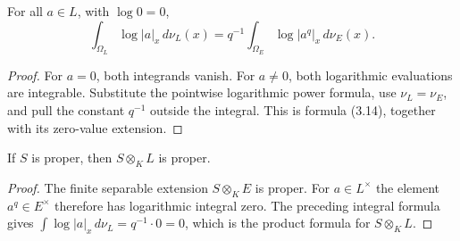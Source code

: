 \begin{proposition}
\label{prop:finite-log-integral}
\leanok
{}
For all $a\in L$, with $\log0=0$,
\[
 \int_{\Omega_L}\log|a|_x\,d\nu_L(x)
 =q^{-1}\int_{\Omega_E}\log|a^q|_x\,d\nu_E(x).
\]
\end{proposition}
\begin{proof}
For $a=0$, both integrands vanish. For $a\ne0$, both logarithmic
evaluations are integrable. Substitute the pointwise logarithmic power
formula, use $\nu_L=\nu_E$, and pull the constant $q^{-1}$ outside
the integral. This is formula (3.14), together with its zero-value
extension.
\end{proof}

\begin{proposition}
\label{prop:finite-proper}
\leanok
{}
If $S$ is proper, then $S\otimes_KL$ is proper.
\end{proposition}
\begin{proof}
The finite separable extension $S\otimes_KE$ is proper. For
$a\in L^\times$ the element $a^q\in E^\times$ therefore has
logarithmic integral zero. The preceding integral formula gives
$\int\log|a|_x\,d\nu_L=q^{-1}\cdot0=0$, which is the product
formula for $S\otimes_KL$.
\end{proof}

